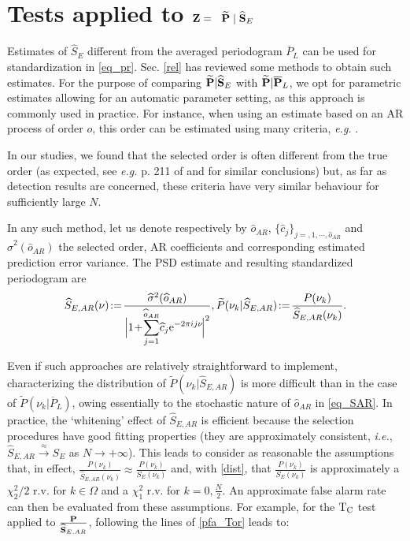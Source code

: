\documentclass[journal]{IEEEtran}
\begin{document}
\section{ Tests { applied to ${\bf{Z}}=$ }  $\widetilde{\bf P} \;|\;\widehat{\bf S}_E$}
\label{sec6}
Estimates of  $\widehat{S}_E$ different from the  averaged periodogram $\overline{P}_L$ can be used for standardization in \eqref{eq_pr}. 
Sec. \ref{rel} has reviewed some  methods to obtain such estimates.
For the purpose of comparing  $\widetilde{\bf P} |\widehat{\bf S}_E$ with  ${\bf \widetilde{\bf P}}|\overline{\bf P}_L$,   
we opt for parametric estimates  allowing { for} an automatic parameter setting, as this approach is  commonly used in practice.
For instance, when using an estimate based on an  AR process of order $o$, this order can be estimated using many criteria, {\textit{e.g.}} \cite{Akaike_1969, Akaike_1974,Parzen_1975, Hannan_1979, Rissanen_1984}. 

In our studies, we found that the selected order is often different from the true order (as expected, see \textit{e.g.} { p. 211 of \cite{Akaike_1969} and \cite{Boardman_2002}} for similar conclusions) but, as far as detection results are concerned,  these criteria  have very similar  behaviour for sufficiently large $N$.   

In any such method, let us denote respectively  by $\widehat{o}_{AR}$, $\{\widehat{c}_j\}_{j=,1,\cdots,\widehat{o}_{AR}}$ and 
$\widehat{\sigma}^2(\widehat{o}_{AR})$ the selected order,  AR coefficients and corresponding estimated prediction error variance.
{ The  PSD estimate and resulting standardized periodogram are
 \begin{equation}  \vspace{-0.2cm}
	\widehat{S}_{E,AR}(\nu)\!: =\! \frac{\widehat{\sigma}^2(\widehat{o}_{AR})}{\Big|1\!+\!\displaystyle{\sum_{j=1}^{\widehat{o}_{AR}}} \widehat{c}_j \mathrm{e}^{-2\pi i j \nu }\! \Big|^2},
	 \widetilde{P}(\nu_k | \widehat{S}_{E,AR}  )\! :=\! \frac{P(\nu_k)}{\widehat{S}_{E,AR} (\nu_k)}.
	 \label{eq_SAR}
\end{equation}
}

Even if such approaches are relatively straightforward to implement, characterizing the distribution of $ \widetilde{P}(\nu_k |\widehat{S}_{E,AR}  )$
 is  more difficult than in the case of  $ \widetilde{P}(\nu_k | \overline{P}_L  )$, owing essentially to the stochastic nature of $\widehat{o}_{AR}$ in \eqref{eq_SAR}. 
In practice, the `whitening' effect of  $\widehat{S}_{E,AR}$ is efficient because the selection procedures have good fitting properties (they are approximately consistent,  \textit{i.e.},  $\hat{S}_{E,AR} \overset{\approx}{\longrightarrow}S_E$ as $N \longrightarrow+\infty$).
 This leads to consider as reasonable  the assumptions that, in effect,  $ \frac{{ { P (\nu_k)}}}{\widehat{ S}_{E,AR} (\nu_k)}\approx  \frac{P(\nu_k)}{S_E(\nu_k)}$
 and, with \eqref{dist}, that $\frac{P(\nu_k)}{S_E(\nu_k)}$ is approximately a  $\chi_2^2/2$ r.v. for $  k \in \Omega$ and a ${\chi_1^2}$ r.v. for $  k= 0,\frac{N}{2}$.
An approximate false alarm rate can then be evaluated from these assumptions.
For example, for the ${\rm T_C}$ test applied to $\frac{\bf{P}}{\widehat{ \bf{S}}_{E,AR} }$, following the lines of \eqref{pfa_Tor} leads to:
\end{document}
